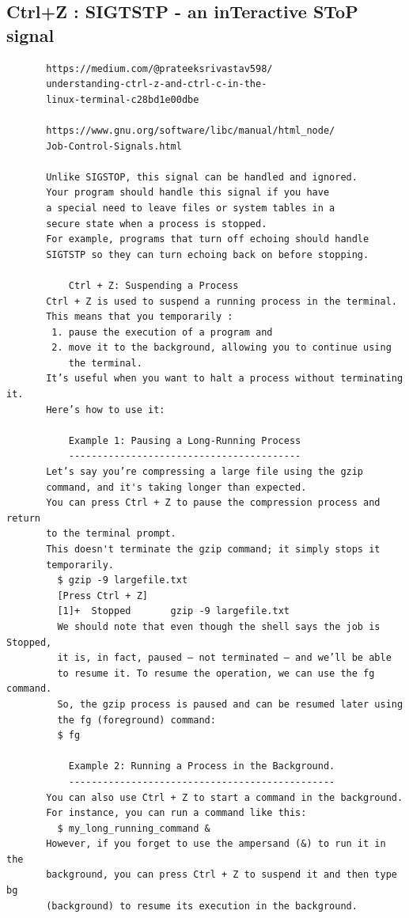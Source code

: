 \documentclass[a4paper,12pt]{article}
\begin{document}
\subsection{Ctrl+Z     : SIGTSTP - an inTeractive SToP signal  }
\begin{verbatim}
       https://medium.com/@prateeksrivastav598/ 
       understanding-ctrl-z-and-ctrl-c-in-the-
       linux-terminal-c28bd1e00dbe
       
       https://www.gnu.org/software/libc/manual/html_node/
       Job-Control-Signals.html
       
       Unlike SIGSTOP, this signal can be handled and ignored.
       Your program should handle this signal if you have
       a special need to leave files or system tables in a
       secure state when a process is stopped.
       For example, programs that turn off echoing should handle   
       SIGTSTP so they can turn echoing back on before stopping.
       
           Ctrl + Z: Suspending a Process
       Ctrl + Z is used to suspend a running process in the terminal.
       This means that you temporarily : 
        1. pause the execution of a program and
        2. move it to the background, allowing you to continue using
           the terminal. 
       It’s useful when you want to halt a process without terminating it.
       Here’s how to use it:
       
           Example 1: Pausing a Long-Running Process
           -----------------------------------------
       Let’s say you’re compressing a large file using the gzip
       command, and it's taking longer than expected.
       You can press Ctrl + Z to pause the compression process and return
       to the terminal prompt.
       This doesn't terminate the gzip command; it simply stops it
       temporarily.
         $ gzip -9 largefile.txt
         [Press Ctrl + Z]
         [1]+  Stopped       gzip -9 largefile.txt
         We should note that even though the shell says the job is Stopped,
         it is, in fact, paused – not terminated – and we’ll be able 
         to resume it. To resume the operation, we can use the fg command.
         So, the gzip process is paused and can be resumed later using
         the fg (foreground) command:
         $ fg
         
           Example 2: Running a Process in the Background.
           -----------------------------------------------
       You can also use Ctrl + Z to start a command in the background.
       For instance, you can run a command like this:
         $ my_long_running_command &
       However, if you forget to use the ampersand (&) to run it in the 
       background, you can press Ctrl + Z to suspend it and then type bg 
       (background) to resume its execution in the background.
       
\end{verbatim}
\end{document}
